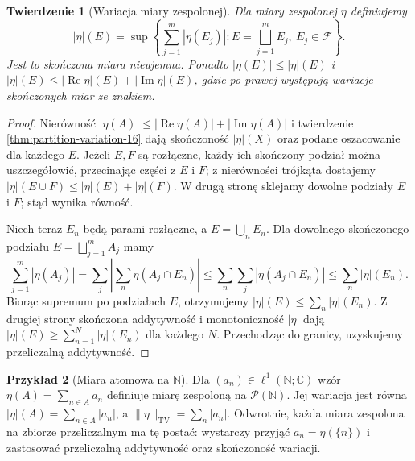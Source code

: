 \documentclass[11pt,a4paper,oneside]{book}
\numberwithin{equation}{chapter}
\theoremstyle{plain}
\newtheorem{twierdzenie}{Twierdzenie}[chapter]
\theoremstyle{definition}
\newtheorem{przyklad}[twierdzenie]{Przykład}
\theoremstyle{remark}
\begin{document}
\begin{twierdzenie}[Wariacja miary zespolonej]
\label{thm:complex-variation-16}
Dla miary zespolonej $\eta$ definiujemy
\[
|\eta|(E)=\sup\left\{\sum_{j=1}^m|\eta(E_j)|:
E=\bigsqcup_{j=1}^mE_j,\ E_j\in\mathcal F\right\}.
\]
Jest to skończona miara nieujemna. Ponadto
$|\eta(E)|\le|\eta|(E)$ i
$|\eta|(E)\le|\operatorname{Re}\eta|(E)+
|\operatorname{Im}\eta|(E)$, gdzie po prawej występują
wariacje skończonych miar ze znakiem.
\end{twierdzenie}
\begin{proof}
Nierówność $|\eta(A)|\le|\operatorname{Re}\eta(A)|+
|\operatorname{Im}\eta(A)|$ i twierdzenie
\ref{thm:partition-variation-16} dają skończoność
$|\eta|(X)$ oraz podane oszacowanie dla każdego $E$.
Jeżeli $E,F$ są rozłączne, każdy ich skończony podział
można uszczegółowić, przecinając części z $E$ i $F$;
z nierówności trójkąta dostajemy
$|\eta|(E\cup F)\le|\eta|(E)+|\eta|(F)$.
W drugą stronę sklejamy dowolne podziały $E$ i $F$;
stąd wynika równość.

Niech teraz $E_n$ będą parami rozłączne, a
$E=\bigcup_nE_n$. Dla dowolnego skończonego
podziału $E=\bigsqcup_{j=1}^m A_j$ mamy
\[
\sum_{j=1}^m|\eta(A_j)|
=\sum_j\left|\sum_n\eta(A_j\cap E_n)\right|
\le\sum_n\sum_j|\eta(A_j\cap E_n)|
\le\sum_n|\eta|(E_n).
\]
Biorąc supremum po podziałach $E$, otrzymujemy
$|\eta|(E)\le\sum_n|\eta|(E_n)$. Z drugiej strony
skończona addytywność i monotoniczność $|\eta|$
dają $|\eta|(E)\ge\sum_{n=1}^N|\eta|(E_n)$
dla każdego $N$. Przechodząc do granicy, uzyskujemy
przeliczalną addytywność.
\end{proof}

\begin{przyklad}[Miara atomowa na $\mathbb N$]
Dla $(a_n)\in\ell^1(\mathbb N;\mathbb C)$ wzór
$\eta(A)=\sum_{n\in A}a_n$ definiuje miarę zespoloną
na $\mathcal P(\mathbb N)$. Jej wariacja jest równa
$|\eta|(A)=\sum_{n\in A}|a_n|$, a
$\|\eta\|_{\mathrm{TV}}=\sum_n|a_n|$.
Odwrotnie, każda miara zespolona na zbiorze
przeliczalnym ma tę postać: wystarczy przyjąć
$a_n=\eta(\{n\})$ i zastosować przeliczalną
addytywność oraz skończoność wariacji.
\end{przyklad}
\end{document}
